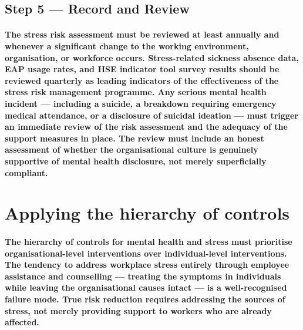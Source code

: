 \subsection{Step 5 --- Record and Review}
\paragraph{The stress risk assessment must be reviewed at least annually and whenever a significant change to the working environment, organisation, or workforce occurs. Stress-related sickness absence data, EAP usage rates, and HSE indicator tool survey results should be reviewed quarterly as leading indicators of the effectiveness of the stress risk management programme. Any serious mental health incident --- including a suicide, a breakdown requiring emergency medical attendance, or a disclosure of suicidal ideation --- must trigger an immediate review of the risk assessment and the adequacy of the support measures in place. The review must include an honest assessment of whether the organisational culture is genuinely supportive of mental health disclosure, not merely superficially compliant.}


\section{Applying the hierarchy of controls}

\paragraph{The hierarchy of controls for mental health and stress must prioritise organisational-level interventions over individual-level interventions. The tendency to address workplace stress entirely through employee assistance and counselling --- treating the symptoms in individuals while leaving the organisational causes intact --- is a well-recognised failure mode. True risk reduction requires addressing the sources of stress, not merely providing support to workers who are already affected.}


